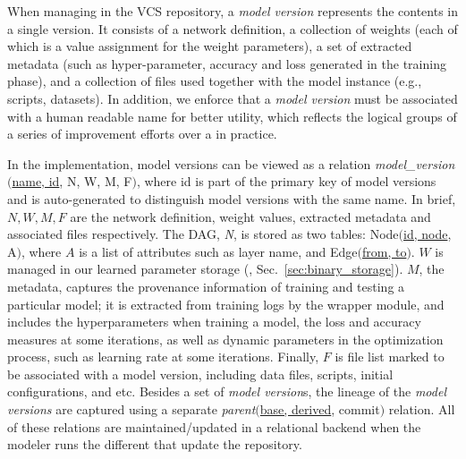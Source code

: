 \documentclass[conference]{IEEEtran}
\begin{document}
When managing \dnn\models in the VCS repository, a \emph{model version} represents the contents in
a single version. It consists of a network definition, a collection of weights (each of which is a
        value assignment for the weight parameters), a set of extracted metadata (such as
            hyper-parameter, accuracy and loss generated in the training phase), and a collection
        of files used together with the model instance (e.g., scripts, datasets). In addition, we
        enforce that a \emph{model version} must be associated with a human readable name for better
        utility, which reflects the logical groups of a series of improvement efforts over a \dnn\model in practice. 


In the implementation, model versions can be viewed as a relation \emph{model\_version}$($\underline{name, id}, N, W, M,
        F$)$, where id is part of the primary key of model versions and is auto-generated to
distinguish model versions with the same name. In brief, $N, W, M, F$ are the network definition,
            weight values, extracted metadata and associated files respectively. The DAG, \emph{N},
            is stored as two tables: Node$($\underline{id, node}, A$)$, where $A$ is a list of
            attributes such as layer name, and Edge$($\underline{from, to}$)$. $W$ is managed in our learned parameter storage (\weightstore, Sec.~\ref{sec:binary_storage}). $M$, the metadata, captures the provenance information of training and testing a particular model; it is extracted from training logs by the wrapper module, and includes the hyperparameters when training a model, the loss and accuracy measures at some iterations, as well as dynamic parameters in the optimization process, such as learning rate at some iterations. Finally, $F$ is file list marked to be associated with a model version, including data files, scripts, initial configurations, and etc.
            Besides a set of \emph{model version}s, the lineage of the \emph{model versions} are captured using a
            separate \emph{parent}$($\underline{base, derived}, commit$)$ relation. All of these relations are maintained/updated in a relational backend when
            the modeler runs the different \dlv\commands that update the repository.
\end{document}

